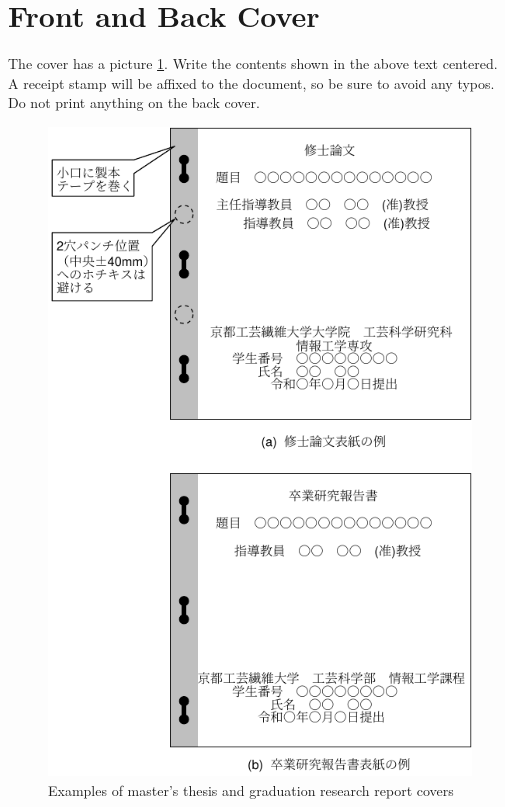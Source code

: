 \section{Front and Back Cover}
The cover has a picture \ref{fig1}. Write the contents shown in the above text centered. A receipt stamp will be affixed to the document, so be sure to avoid any typos. Do not print anything on the back cover.

\begin{figure}[p] %
\begin{center}
\includegraphics[scale=1.0]{assets/coverpage.pdf}
\caption{Examples of master's thesis and graduation research report covers}
\label{fig1} %
\end{center}
\end{figure}

